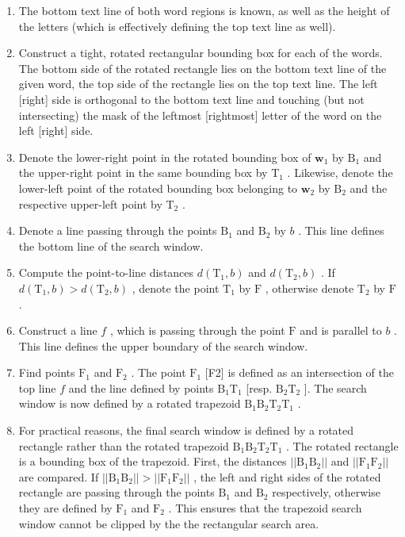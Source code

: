 \documentclass[12pt,a4paper]{report}
\begin{document}
\begin{enumerate}
    \item The bottom text line of both word regions is known, as well as the height of the letters (which is effectively defining the top text line as well).
    \item Construct a tight, rotated rectangular bounding box for each of the words. The bottom side of the rotated rectangle lies on the bottom text line of the given word, the top side of the rectangle lies on the top text line. The left [right] side is orthogonal to the bottom text line and touching (but not intersecting) the mask of the leftmost [rightmost] letter of the word on the left [right] side.
    \item Denote the lower-right point in the rotated bounding box of $\mathbf{w}_1$ by $\mathrm{B}_1$ and the upper-right point in the same bounding box by $\mathrm{T}_1$ . Likewise, denote the lower-left point of the rotated bounding box belonging to $\mathbf{w}_2$ by $\mathrm{B}_2$ and the respective upper-left point by $\mathrm{T}_2$ .
    \item Denote a line passing through the points $\mathrm{B}_1$ and $\mathrm{B}_2$ by $b$ . This line defines the bottom line of the search window.
    \item Compute the point-to-line distances $d(\mathrm{T}_1, b)$ and $d(\mathrm{T}_2, b)$ . If $d(\mathrm{T}_1, b) > d(\mathrm{T}_2, b)$ , denote the point $\mathrm{T}_1$ by $\mathrm{F}$ , otherwise denote $\mathrm{T}_2$ by $\mathrm{F}$ .
    \item Construct a line $f$ , which is passing through the point $\mathrm{F}$ and is parallel to $b$ . This line defines the upper boundary of the search window.
    \item Find points $\mathrm{F}_1$ and $\mathrm{F}_2$ . The point $\mathrm{F}_1$ [F2] is defined as an intersection of the top line $f$ and the line defined by points $\mathrm{B}_1\mathrm{T}_1$ [resp. $\mathrm{B}_2\mathrm{T}_2$ ]. The search window is now defined by a rotated trapezoid $\mathrm{B}_1\mathrm{B}_2\mathrm{T}_2\mathrm{T}_1$ .
    \item For practical reasons, the final search window is defined by a rotated rectangle rather than the rotated trapezoid $\mathrm{B}_1\mathrm{B}_2\mathrm{T}_2\mathrm{T}_1$ . The rotated rectangle is a bounding box of the trapezoid. First, the distances $||\mathrm{B}_1\mathrm{B}_2||$ and $||\mathrm{F}_1\mathrm{F}_2||$ are compared. If $||\mathrm{B}_1\mathrm{B}_2|| > ||\mathrm{F}_1\mathrm{F}_2||$ , the left and right sides of the rotated rectangle are passing through the points $\mathrm{B}_1$ and $\mathrm{B}_2$ respectively, otherwise they are defined by $\mathrm{F}_1$ and $\mathrm{F}_2$ . This ensures that the trapezoid search window cannot be clipped by the the rectangular search area.
\end{enumerate}
\end{document}
